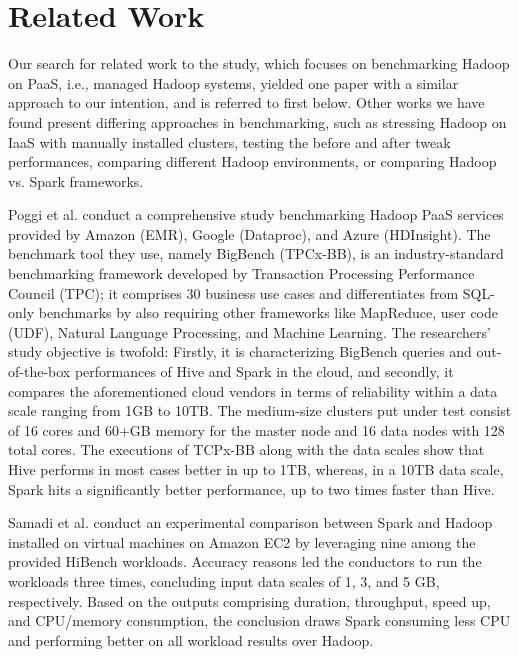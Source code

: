 \documentclass[review]{elsarticle}
\begin{document}
\section{Related Work}
Our search for related work to the study, which focuses on benchmarking Hadoop on PaaS, i.e., managed Hadoop systems, yielded one paper with a similar approach to our intention, and is referred to first below. Other works we have found present differing approaches in benchmarking, such as stressing Hadoop on IaaS with manually installed clusters, testing the before and after tweak performances, comparing different Hadoop environments, or comparing Hadoop vs. Spark frameworks.

Poggi et al. \cite{poggi_characterizing_2018} conduct a comprehensive study benchmarking Hadoop PaaS services provided by Amazon (EMR), Google (Dataproc), and Azure (HDInsight). The benchmark tool they use, namely BigBench (TPCx-BB), is an industry-standard benchmarking framework developed by Transaction Processing Performance Council (TPC); it comprises 30 business use cases and differentiates from SQL-only benchmarks by also requiring other frameworks like MapReduce, user code (UDF), Natural Language Processing, and Machine Learning. The researchers' study objective is twofold: Firstly, it is characterizing BigBench queries and out-of-the-box performances of Hive and Spark in the cloud, and secondly, it compares the aforementioned cloud vendors in terms of reliability within a data scale ranging from 1GB to 10TB. The medium-size clusters put under test consist of 16 cores and 60+GB memory for the master node and 16 data nodes with 128 total cores. The executions of TCPx-BB along with the data scales show that Hive performs in most cases better in up to 1TB, whereas, in a 10TB data scale, Spark hits a significantly better performance, up to two times faster than Hive.

Samadi et al. \cite{samadi_performance_2018} conduct an experimental comparison between Spark and Hadoop installed on virtual machines on Amazon EC2 by leveraging nine among the provided HiBench workloads. Accuracy reasons led the conductors to run the workloads three times, concluding input data scales of 1, 3, and 5 GB, respectively. Based on the outputs comprising duration, throughput, speed up, and CPU/memory consumption, the conclusion draws Spark consuming less CPU and performing better on all workload results over Hadoop. 
\end{document}
